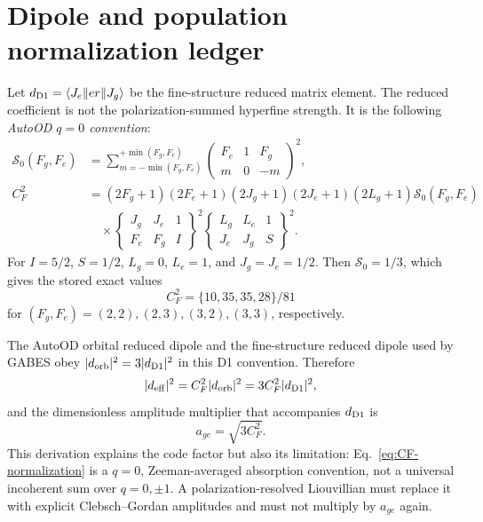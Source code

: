 \documentclass[11pt,a4paper]{article}
\begin{document}
\section{Dipole and population normalization ledger}
\label{app:normalization}

Let $d_{\rm D1}=\langle J_e\|er\|J_g\rangle$ be the fine-structure reduced
matrix element. The reduced coefficient is not the polarization-summed
hyperfine strength. It is the following \emph{AutoOD $q=0$ convention}:
\begin{align}
\mathcal S_0(F_g,F_e)
&=\sum_{m=-\min(F_g,F_e)}^{+\min(F_g,F_e)}
\begin{pmatrix}F_e&1&F_g\\m&0&-m\end{pmatrix}^{\!2},\\
C_F^2&=(2F_g+1)(2F_e+1)(2J_g+1)(2J_e+1)(2L_g+1)
\mathcal S_0(F_g,F_e)\nonumber\\
&\quad\times
\begin{Bmatrix}J_g&J_e&1\\F_e&F_g&I\end{Bmatrix}^{\!2}
\begin{Bmatrix}L_g&L_e&1\\J_e&J_g&S\end{Bmatrix}^{\!2}.
\label{eq:CF-normalization}
\end{align}
For $I=5/2$, $S=1/2$, $L_g=0$, $L_e=1$, and
$J_g=J_e=1/2$. Then $\mathcal S_0=1/3$, which gives the stored exact values
\[
C_F^2=\{10,35,35,28\}/81
\]
for $(F_g,F_e)=(2,2),(2,3),(3,2),(3,3)$, respectively.

The AutoOD orbital reduced dipole and the fine-structure reduced dipole used
by GABES obey $|d_{\rm orb}|^2=3|d_{\rm D1}|^2$ in this D1 convention.
Therefore
\[
|d_{\rm eff}|^2=C_F^2|d_{\rm orb}|^2
=3C_F^2|d_{\rm D1}|^2,
\]
and the dimensionless amplitude multiplier that accompanies
$d_{\rm D1}$ is
\begin{equation}
a_{ge}=\sqrt{3C_F^2}.
\label{eq:age-normalization}
\end{equation}
This derivation explains the code factor but also its limitation:
Eq.~\eqref{eq:CF-normalization} is a $q=0$, Zeeman-averaged absorption
convention, not a universal incoherent sum over $q=0,\pm1$. A
polarization-resolved Liouvillian must replace it with explicit
Clebsch--Gordan amplitudes and must not multiply by $a_{ge}$ again.
\end{document}
